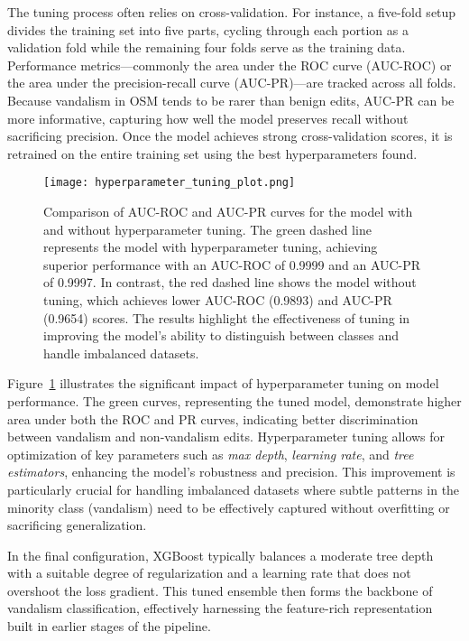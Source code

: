 \documentclass[
    13pt, %
    a4paper, %
    DIV14, %
    listof=totoc, %
    bibliography=totoc, %
    index=totoc, %
    headsepline
]{scrreprt}
\begin{document}
The tuning process often relies on cross-validation. For instance, a five-fold setup divides the training set into five parts, cycling through each portion as a validation fold while the remaining four folds serve as the training data. Performance metrics—commonly the area under the ROC curve (AUC-ROC) or the area under the precision-recall curve (AUC-PR)—are tracked across all folds. Because vandalism in OSM tends to be rarer than benign edits, AUC-PR can be more informative, capturing how well the model preserves recall without sacrificing precision. Once the model achieves strong cross-validation scores, it is retrained on the entire training set using the best hyperparameters found.

\noindent
\begin{figure}[htbp]
    \centering
    \texttt{[image: hyperparameter\_tuning\_plot.png]}
    \caption{Comparison of AUC-ROC and AUC-PR curves for the model with and without hyperparameter tuning. The green dashed line represents the model with hyperparameter tuning, achieving superior performance with an AUC-ROC of 0.9999 and an AUC-PR of 0.9997. In contrast, the red dashed line shows the model without tuning, which achieves lower AUC-ROC (0.9893) and AUC-PR (0.9654) scores. The results highlight the effectiveness of tuning in improving the model's ability to distinguish between classes and handle imbalanced datasets.}
    \label{fig:hyperparam_tuning_plot}
\end{figure}

\noindent
Figure~\ref{fig:hyperparam_tuning_plot} illustrates the significant impact of hyperparameter tuning on model performance. The green curves, representing the tuned model, demonstrate higher area under both the ROC and PR curves, indicating better discrimination between vandalism and non-vandalism edits. Hyperparameter tuning allows for optimization of key parameters such as \textit{max depth}, \textit{learning rate}, and \textit{tree estimators}, enhancing the model's robustness and precision. This improvement is particularly crucial for handling imbalanced datasets where subtle patterns in the minority class (vandalism) need to be effectively captured without overfitting or sacrificing generalization.

In the final configuration, XGBoost typically balances a moderate tree depth with a suitable degree of regularization and a learning rate that does not overshoot the loss gradient. This tuned ensemble then forms the backbone of vandalism classification, effectively harnessing the feature-rich representation built in earlier stages of the pipeline.
\end{document}
